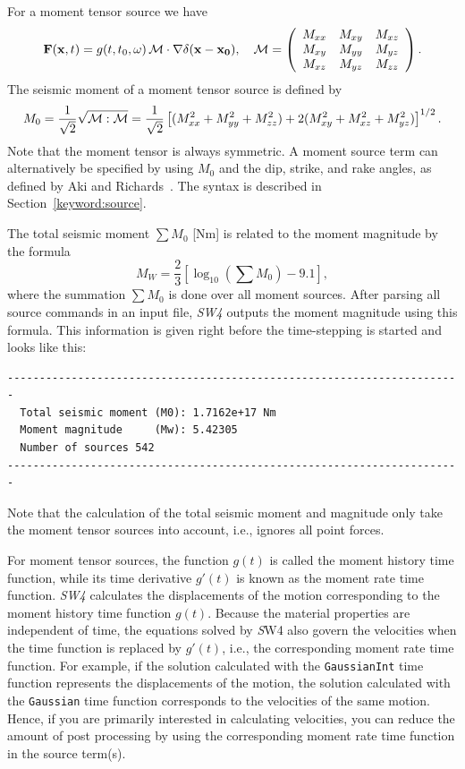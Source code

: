 \documentclass[11pt]{report}
\begin{document}
For a moment tensor source we have
\[
{\bf F}({\bf x},t) = g(t,t_0,\omega)\, {\cal  M} \cdot \nabla \delta ({\bf x} - {\bf
  x_0}), \quad 
{\cal M} = \left(\begin{array}{ccc}
M_{xx} & M_{xy} & M_{xz}\\
M_{xy} & M_{yy} & M_{yz}\\
M_{xz} & M_{yz} & M_{zz}
\end{array}
\right).
\]
The seismic moment of a moment tensor source is defined by 
\[
M_0 = \frac{1}{\sqrt{2}}\sqrt{{\cal M}:{\cal M}} = \frac{1}{\sqrt{2}}\left[ (M_{xx}^2 + M_{yy}^2 + M_{zz}^2 ) + 2
  (M_{xy}^2 + M_{xz}^2 + M_{yz}^2) \right]^{1/2}.
\]
Note that the moment tensor is always symmetric. A moment source term can alternatively be specified
by using $M_0$ and the dip, strike, and rake angles, as defined by Aki and
Richards~\cite{Aki-Richards-02}. The syntax is described in Section~\ref{keyword:source}.

The total seismic moment $\sum M_0$ [Nm] is related to the moment magnitude by the formula
\[
M_W = \frac{2}{3}\left[\log_{10}\left(\sum M_0\right) - 9.1\right],
\]
where the summation $\sum M_0$ is done over all moment sources.
After parsing all source commands in an input file, \emph{SW4} outputs the moment magnitude using
this formula. This information is given right before the time-stepping is started and looks like this:
\begin{verbatim}
-----------------------------------------------------------------------
  Total seismic moment (M0): 1.7162e+17 Nm 
  Moment magnitude     (Mw): 5.42305
  Number of sources 542
-----------------------------------------------------------------------
\end{verbatim}
Note that the calculation of the total seismic moment and magnitude only take the moment tensor sources into
account, i.e., ignores all point forces.

For moment tensor sources, the function $g(t)$ is called the moment history time function, while its
time derivative $g'(t)$ is known as the moment rate time function. \emph{SW4} calculates the
displacements of the motion corresponding to the moment history time function $g(t)$. Because
the material properties are independent of time, the equations solved by {\emph SW4} also govern the
velocities when the time function is replaced by $g'(t)$, i.e., the corresponding moment rate time
function. For example, if the solution calculated with the {\tt GaussianInt} time function
represents the displacements of the motion, the solution calculated with the {\tt Gaussian} time
function corresponds to the velocities of the same motion. Hence, if you are primarily interested in
calculating velocities, you can reduce the amount of post processing by using the corresponding
moment rate time function in the source term(s). 
\end{document}
